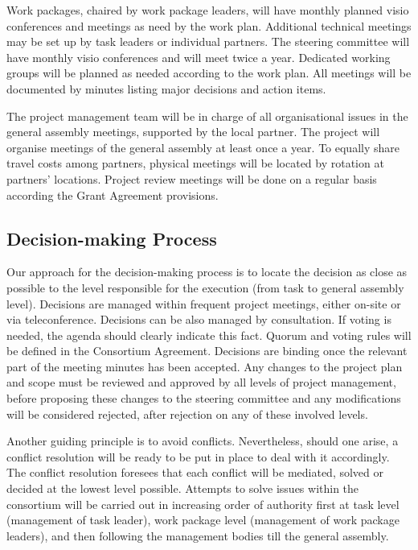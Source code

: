 Work packages, chaired by work package leaders, will have monthly
planned visio conferences and meetings as need by the work plan.
Additional technical meetings may be set up by task leaders or
individual partners. The steering committee will have monthly visio
conferences and will meet twice a year. Dedicated working groups will
be planned as needed according to the work plan.  All meetings will be
documented by minutes listing major decisions and action items.

The project management team will be in charge of all organisational
issues in the general assembly meetings, supported by the local
partner. The project will organise meetings of the general assembly at
least once a year. To equally share travel costs among partners,
physical meetings will be located by rotation at partners’
locations. Project review meetings will be done on a regular basis
according the Grant Agreement provisions.

\subsection*{Decision-making Process}

Our approach for the decision-making process is to locate the decision
as close as possible to the level responsible for the execution (from
task to general assembly level). Decisions are managed within
frequent project meetings, either on-site or via
teleconference. Decisions can be also managed by consultation. If
voting is needed, the agenda should clearly indicate this fact. Quorum
and voting rules will be defined in the Consortium
Agreement. Decisions are binding once the relevant part of the meeting
minutes has been accepted. Any changes to the project plan and scope
must be reviewed and approved by all levels of project management,
before proposing these changes to the steering committee and any
modifications will be considered rejected, after rejection on any of
these involved levels.

Another guiding principle is to avoid conflicts. Nevertheless, should
one arise, a conflict resolution will be ready to be put in place to
deal with it accordingly. The conflict resolution foresees that each
conflict will be mediated, solved or decided at the lowest level
possible. Attempts to solve issues within the consortium will be
carried out in increasing order of authority first at task level
(management of task leader), work package level (management of work
package leaders), and then following the management bodies till the
general assembly.

